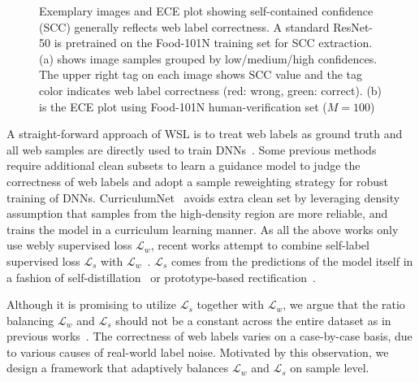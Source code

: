 \documentclass[runningheads]{llncs}
\begin{document}
\begin{figure}[t]
	\centering
{}
     \hfill
	\caption{Exemplary images and ECE plot showing self-contained confidence (SCC) generally reflects web label correctness. A standard ResNet-50 is pretrained on the Food-101N training set for SCC extraction. (a) shows image samples grouped by low/medium/high confidences. The upper right tag on each image shows SCC value and the tag color indicates web label correctness (red: wrong, green: correct). (b) is the ECE plot using Food-101N human-verification set ($M=100$)}
	\label{fig:into}
\end{figure}

A straight-forward approach of WSL is to treat web labels as ground truth and all web samples are directly used to train DNNs~\cite{mahajan2018exploring,sun2017revisiting}. 
Some previous methods~\cite{jiang2018mentornet,lee2018cleannet} require additional clean subsets to learn a guidance model to judge the correctness of web labels and adopt a sample reweighting strategy for robust training of DNNs.
CurriculumNet~\cite{guo2018curriculumnet} avoids extra clean set by leveraging density assumption that samples from the high-density region are more reliable, and trains the model in a curriculum learning manner.
As all the above works only use webly supervised loss $\mathcal{L}_w$, recent works attempt to combine self-label supervised loss $\mathcal{L}_s$ with $\mathcal{L}_w$~\cite{han2019deep,tanaka2018joint}. $\mathcal{L}_s$ comes from the predictions of the model itself in a fashion of self-distillation~\cite{hinton2015distilling} or prototype-based rectification~\cite{snell2017prototypical}. 

Although it is promising to utilize $\mathcal{L}_s$ together with $\mathcal{L}_w$, we argue that the ratio balancing $\mathcal{L}_w$ and $\mathcal{L}_s$ should not be a constant across the entire dataset as in previous works~\cite{han2019deep,tanaka2018joint}. The correctness of web labels varies on a case-by-case basis, due to various causes of real-world label noise. Motivated by this observation, we design a framework that adaptively balances $\mathcal{L}_w$ and $\mathcal{L}_s$ on sample level.  
\end{document}
